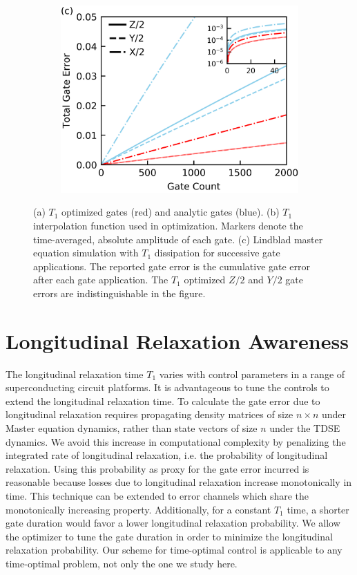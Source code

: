 \documentclass[
  amsfonts,
  amsmath,
  tbtags,
  amssymb,
  aps,
  nobibnotes,
  twocolumn,
  superscriptaddress,
]{revtex4-2}
\begin{document}
\begin{figure}[ht]
\begin{subfigure}{.23\textwidth}
  \end{subfigure}\hfill
  \begin{subfigure}{.4\textwidth}
    \includegraphics[width=\linewidth]{assets/f1c.png}
  \end{subfigure}
  \caption{
    (a) $T_{1}$ optimized gates (red) and analytic gates (blue).
    (b) $T_{1}$ interpolation function used in optimization. Markers
    denote the time-averaged, absolute amplitude of each gate.
    (c) Lindblad master equation simulation with $T_{1}$ dissipation
    for successive gate applications. The reported gate error is the cumulative
    gate error after each gate application.
    The $T_{1}$ optimized $Z/2$ and $Y/2$ gate errors are indistinguishable
    in the figure.
  }
\end{figure}

\section{Longitudinal Relaxation Awareness}
The longitudinal relaxation time $T_{1}$ varies with
control parameters in a range of superconducting circuit platforms.
It is advantageous to tune the controls to extend the longitudinal
relaxation time.
To calculate the gate error due to longitudinal relaxation
requires propagating density matrices of size $n \times n$ under Master equation
dynamics, rather than state vectors of size $n$ under the TDSE dynamics.
We avoid this increase in computational complexity by
penalizing the integrated rate of longitudinal relaxation,
i.e. the probability of longitudinal relaxation.
Using this probability as proxy for the gate error incurred
is reasonable because losses due to longitudinal relaxation
increase monotonically in time.
This technique can be extended to
error channels which share the monotonically increasing property.
Additionally, for a constant $T_{1}$ time, a shorter gate duration
would favor a lower longitudinal relaxation probability. We allow
the optimizer to tune the gate duration in order to minimize the
longitudinal relaxation probability. Our scheme for time-optimal
control is applicable to any time-optimal problem, not only
the one we study here.
\end{document}
